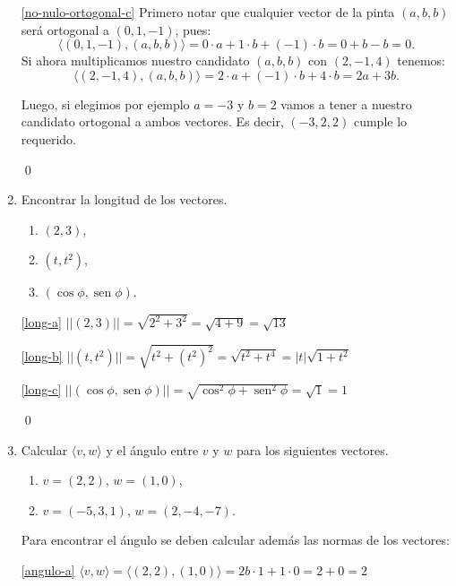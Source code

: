 \begin{enumerate}[topsep=6pt, itemsep=.4cm]
\noindent\ref{no-nulo-ortogonal-c} Primero notar que cualquier vector de la pinta $(a,b,b)$ será ortogonal a $(0,1,-1)$, pues:
$$\langle (0,1,-1),(a,b,b)\rangle = 0 \cdot a + 1 \cdot b + (-1) \cdot b = 0 + b - b = \boxed{0}.$$
Si ahora multiplicamos nuestro candidato $(a,b,b)$ con $(2,-1,4)$ tenemos:
$$\langle (2,-1,4) , (a,b,b) \rangle = 2 \cdot a + (-1) \cdot b + 4 \cdot b = \boxed{2a + 3 b}.$$

Luego, si elegimos por ejemplo $a=-3$ y $b=2$ vamos a tener a nuestro candidato ortogonal a ambos vectores. Es decir, $(-3,2,2)$ cumple lo requerido.


\qed

\item Encontrar la longitud de los vectores.
\begin{multicols}{3}
    \begin{enumerate}
        \item\label{long-a} $(2,3)$,
        \item\label{long-b} $(t,t^2)$,
        \item\label{long-c} $(\cos\phi,\operatorname{sen}\phi)$.
    \end{enumerate}
\end{multicols}


\rta 

\noindent\ref{long-a} $||(2,3)|| = \sqrt{2^2 + 3^2} = \sqrt{4+9} = \boxed{\sqrt{13}}$

\noindent\ref{long-b} $||(t,t^2)|| = \sqrt{t^2 + (t^2)^2} = \sqrt{t^2+t^4} = \boxed{|t|\sqrt{1+t^2}}$

\noindent\ref{long-c} $||(\cos\phi,\operatorname{sen}\phi)|| = \sqrt{\cos^2\phi + \operatorname{sen}^2\phi} = \sqrt{1} = \boxed{1}$


\qed

\item Calcular $\langle v , w  \rangle$ y el ángulo entre $v$ y $w$  para los siguientes vectores.
\begin{multicols}{2}
    \begin{enumerate}
        \item\label{angulo-a} $v=(2,2)$, $w=(1,0)$,
        \item\label{angulo-b} $v=(-5,3,1)$, $w=(2,-4,-7)$.
    \end{enumerate}
\end{multicols}

\rta Para encontrar el ángulo se deben calcular además las normas de los vectores:

\noindent\ref{angulo-a} $\langle v , w  \rangle = \langle (2,2) , (1,0)  \rangle = 2b\cdot 1 + 1 \cdot 0 = 2 + 0 = \boxed{2}$


\end{enumerate}
